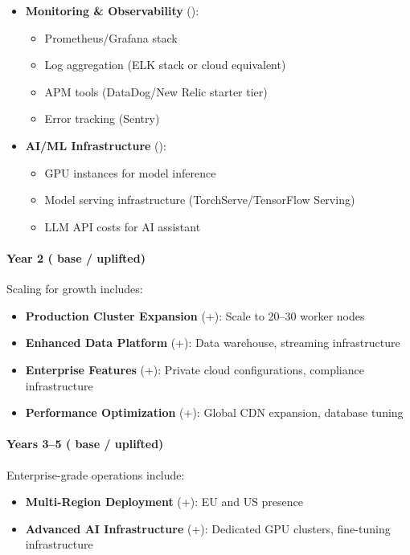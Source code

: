 \documentclass[11pt, a4paper, oneside]{article}
\begin{document}
\begin{itemize}
    \item \textbf{Monitoring \& Observability} ():
    \begin{itemize}
        \item Prometheus/Grafana stack
        \item Log aggregation (ELK stack or cloud equivalent)
        \item APM tools (DataDog/New Relic starter tier)
        \item Error tracking (Sentry)
    \end{itemize}
    
    \item \textbf{AI/ML Infrastructure} ():
    \begin{itemize}
        \item GPU instances for model inference
        \item Model serving infrastructure (TorchServe/TensorFlow Serving)
        \item LLM API costs for AI assistant
    \end{itemize}
\end{itemize}

\paragraph{Year 2 ( base /  uplifted)}
Scaling for growth includes:
\begin{itemize}
    \item \textbf{Production Cluster Expansion} (+): Scale to 20--30 worker nodes
    \item \textbf{Enhanced Data Platform} (+): Data warehouse, streaming infrastructure
    \item \textbf{Enterprise Features} (+): Private cloud configurations, compliance infrastructure
    \item \textbf{Performance Optimization} (+): Global CDN expansion, database tuning
\end{itemize}

\paragraph{Years 3--5 ( base /  uplifted)}
Enterprise-grade operations include:
\begin{itemize}
    \item \textbf{Multi-Region Deployment} (+): EU and US presence
    \item \textbf{Advanced AI Infrastructure} (+): Dedicated GPU clusters, fine-tuning infrastructure
\end{itemize}
\end{document}
